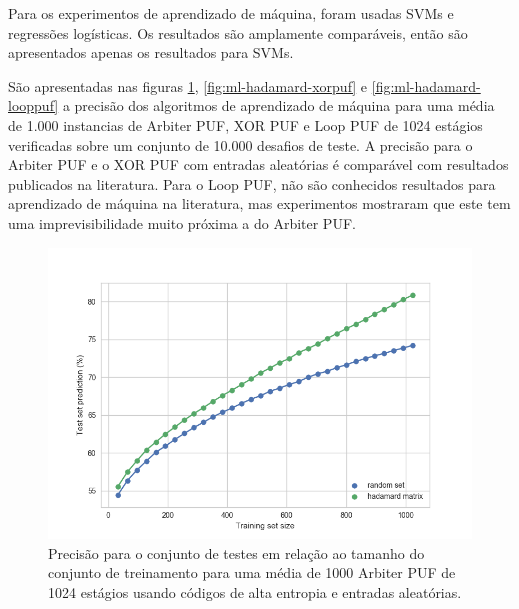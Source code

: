 \documentclass[pdftex,11pt]{article}
\begin{document}
\begin{spacing}{1.5}
Para os experimentos de aprendizado de máquina, foram usadas SVMs e regressões logísticas. Os resultados são amplamente comparáveis, então são apresentados apenas os resultados para SVMs.

São apresentadas nas figuras \ref{fig:ml-hadamard-apuf}, \ref{fig:ml-hadamard-xorpuf} e \ref{fig:ml-hadamard-looppuf} a precisão dos algoritmos de aprendizado de máquina para uma média de 1.000 instancias de Arbiter PUF, XOR PUF e Loop PUF de 1024 estágios verificadas sobre um conjunto de 10.000 desafios de teste. A precisão para o Arbiter PUF e o XOR PUF com entradas aleatórias é comparável com resultados publicados na literatura. Para o Loop PUF, não são conhecidos resultados para aprendizado de máquina na literatura, mas experimentos mostraram que este tem uma imprevisibilidade muito próxima a do Arbiter PUF.

\begin{figure}
\label{fig:ml-hadamard-apuf}
\centering
\includegraphics[width=12cm]{ml-hadamard-apuf.png}
    \caption{Precisão para o conjunto de testes em relação ao tamanho do conjunto de treinamento para uma média de 1000 Arbiter PUF de 1024 estágios usando códigos de alta entropia e entradas aleatórias.}
\end{figure}


\end{spacing}
\end{document}
